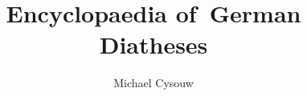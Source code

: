 \author{Michael Cysouw}
\title{Encyclopaedia of German Diatheses}

\BackBody{}

\renewcommand{\lsSeries}{ogl}



